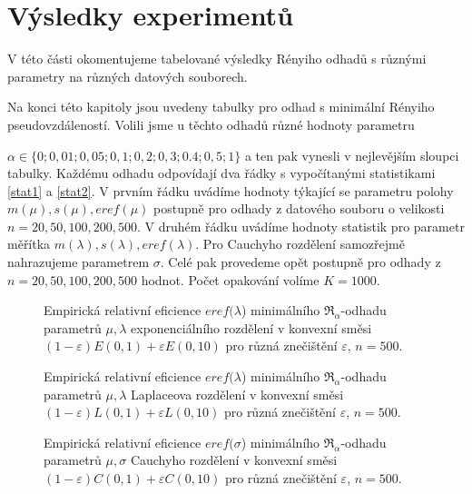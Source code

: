 \section{Výsledky experimentů}


V této části okomentujeme tabelované výsledky Rényiho odhadů s různými parametry na různých datových souborech.

Na konci této kapitoly jsou uvedeny tabulky pro odhad s minimální Rényiho pseudovzdá\-le\-nos\-tí. Volili jsme u těchto odhadů různé hodnoty parametru 

\noindent $\alpha \in \lbrace 0;0,01;0,05;0,1;0,2;0,3;0.4;0,5;1 \rbrace$ a ten pak vynesli v nejlevějším sloupci tabulky. Každému odhadu odpovídají dva řádky s vypočítanými statistikami \eqref{stat1} a \eqref{stat2}. V prvním řádku uvádíme hodnoty týkající se parametru polohy $m(\mu), s(\mu), eref(\mu)$ postupně pro odhady z datového souboru o velikosti $n = 20, 50 ,100, 200, 500$. V druhém řádku uvádíme hodnoty statistik pro parametr měřítka $m(\lambda), s(\lambda), eref(\lambda)$. Pro Cauchyho rozdělení samozřejmě nahrazujeme parametrem $\sigma$. Celé pak provedeme opět postupně pro odhady z $n = 20, 50 ,100, 200, 500$ hodnot. Počet opakování volíme $K = 1000$.



\begin{figure}[htb]
	\begin{center}
		\caption{Empirická relativní eficience $eref({\lambda}$) minimálního $\mathfrak{R}_\alpha$-odhadu parametrů $\mu,\lambda$ exponenciálního rozdělení v konvexní směsi 
		$(1-\varepsilon)E(0,1) + \varepsilon E(0,10)$ pro různá znečištění $\varepsilon$, $n=500$.}
		\label{fig-eref-Exp-lambda}
	\end{center}
\end{figure}

\begin{figure}[htb]
	\begin{center}
		\caption{Empirická relativní eficience $eref({\lambda}$) minimálního $\mathfrak{R}_\alpha$-odhadu parametrů  $\mu,\lambda$ Laplaceova rozdělení v konvexní směsi	$(1-\varepsilon)L(0,1) + \varepsilon L(0,10)$ pro různá znečištění $\varepsilon$, $n=500$.}
		\label{fig-eref-Laplace-lambda}
	\end{center}
\end{figure}

\begin{figure}[htb]
	\begin{center}
		\caption{Empirická relativní eficience $eref({\sigma}$) minimálního $\mathfrak{R}_\alpha$-odhadu parametrů  $\mu,\sigma$ Cauchyho rozdělení v konvexní směsi	$(1-\varepsilon)C(0,1) + \varepsilon C(0,10)$ pro různá znečištění $\varepsilon$, $n=500$.}
		\label{fig-eref-Cauchy-sigma}
	\end{center}
\end{figure}

